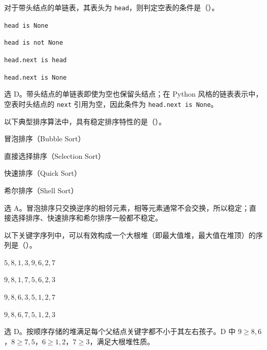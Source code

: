 \begin{question}
对于带头结点的单链表，其表头为 \texttt{head}，则判定空表的条件是（\quad）。
\begin{choiceoptions}[2]
  \item \texttt{head is None}
  \item \texttt{head is not None}
  \item \texttt{head.next is head}
  \item \texttt{head.next is None}
\end{choiceoptions}
\begin{solution}
选 D。带头结点的单链表即使为空也保留头结点；在 Python 风格的链表表示中，空表时头结点的 \texttt{next} 引用为空，因此条件为 \texttt{head.next is None}。
\end{solution}
\end{question}

\begin{question}
以下典型排序算法中，具有稳定排序特性的是（\quad）。
\begin{choiceoptions}[1]
  \item 冒泡排序（Bubble Sort）
  \item 直接选择排序（Selection Sort）
  \item 快速排序（Quick Sort）
  \item 希尔排序（Shell Sort）
\end{choiceoptions}
\begin{solution}
选 A。冒泡排序只交换逆序的相邻元素，相等元素通常不会交换，所以稳定；直接选择排序、快速排序和希尔排序一般都不稳定。
\end{solution}
\end{question}

\begin{question}
以下关键字序列中，可以有效构成一个大根堆（即最大值堆，最大值在堆顶）的序列是（\quad）。
\begin{choiceoptions}[1]
  \item $5,8,1,3,9,6,2,7$
  \item $9,8,1,7,5,6,2,3$
  \item $9,8,6,3,5,1,2,7$
  \item $9,8,6,7,5,1,2,3$
\end{choiceoptions}
\begin{solution}
选 D。按顺序存储的堆满足每个父结点关键字都不小于其左右孩子。D 中 $9\ge 8,6$，$8\ge 7,5$，$6\ge 1,2$，$7\ge 3$，满足大根堆性质。
\end{solution}
\end{question}

